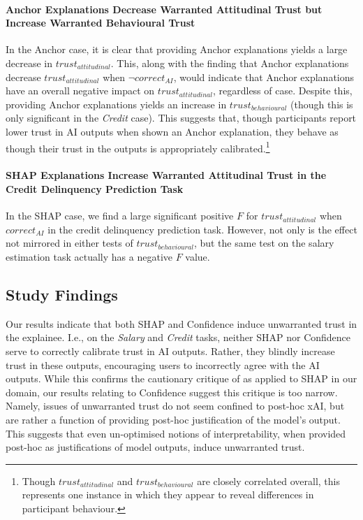 \paragraph{Anchor Explanations Decrease Warranted Attitudinal Trust but Increase Warranted Behavioural Trust}
In the Anchor case, it is clear that providing Anchor explanations yields a large decrease in $trust_{attitudinal}$. This, along with the finding that Anchor explanations decrease $trust_{attitudinal}$ when $\neg correct_{AI}$, would indicate that Anchor explanations have an overall negative impact on $trust_{attitudinal}$, regardless of case. Despite this, providing Anchor explanations yields an increase in $trust_{behavioural}$ (though this is only significant in the \emph{Credit} case). This suggests that, though participants report lower trust in AI outputs when shown an Anchor explanation, they behave as though their trust in the outputs is appropriately calibrated.\footnote{Though $trust_{attitudinal}$ and $trust_{behavioural}$ are closely correlated overall, this represents one instance in which they appear to reveal differences in participant behaviour.}

\paragraph{SHAP Explanations Increase Warranted Attitudinal Trust in the Credit Delinquency Prediction Task}
In the SHAP case, we find a large significant positive $F$ for $trust_{attitudinal}$ when $correct_{AI}$ in the credit delinquency prediction task. However, not only is the effect not mirrored in either tests of $trust_{behavioural}$, but the same test on the salary estimation task actually has a negative $F$ value.

\subsection{Study Findings}\label{ssec:os_discussion}
Our results indicate that both SHAP and Confidence induce unwarranted trust in the explainee. I.e., on the \emph{Salary} and \emph{Credit} tasks, neither SHAP nor Confidence serve to correctly calibrate trust in AI outputs. Rather, they blindly increase trust in these outputs, encouraging users to incorrectly agree with the AI outputs. While this confirms the cautionary critique of \textcite{Lipton} as applied to SHAP in our domain, our results relating to Confidence suggest this critique is too narrow. Namely, issues of unwarranted trust do not seem confined to post-hoc xAI, but are rather a function of providing post-hoc justification of the model's output. This suggests that even un-optimised notions of interpretability, when provided post-hoc as justifications of model outputs, induce unwarranted trust.

